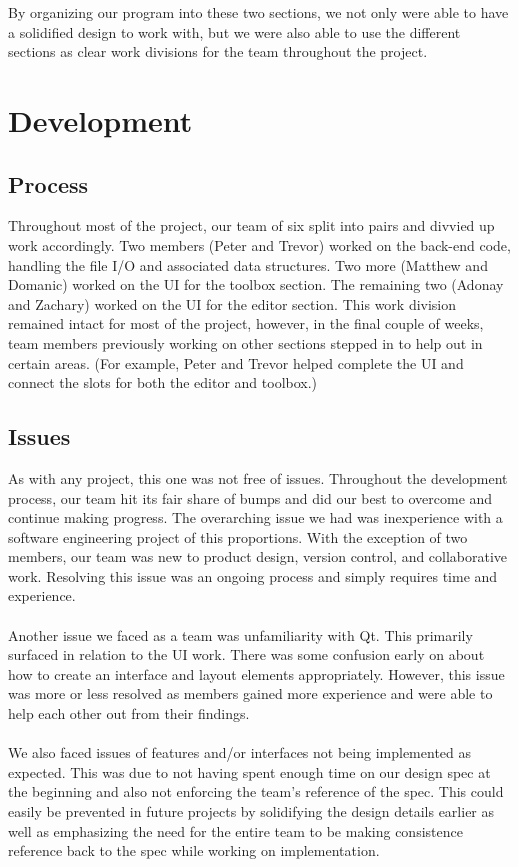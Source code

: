 \documentclass[12pt]{article}
\begin{document}
	By organizing our program into these two sections, we not only were able to have a solidified design to work with, but we were also able to use the different sections as clear work divisions for the team throughout the project. 
	
	\clearpage
	\section{Development}
	\subsection{Process}
	Throughout most of the project, our team of six split into pairs and divvied up work accordingly. Two members (Peter and Trevor) worked on the back-end code, handling the file I/O and associated data structures. Two more (Matthew and Domanic) worked on the UI for the toolbox section. The remaining two (Adonay and Zachary) worked on the UI for the editor section. This work division remained intact for most of the project, however, in the final couple of weeks, team members previously working on other sections stepped in to help out in certain areas. (For example, Peter and Trevor helped complete the UI and connect the slots for both the editor and toolbox.) 
	\subsection{Issues}
	As with any project, this one was not free of issues. Throughout the development process, our team hit its fair share of bumps and did our best to overcome and continue making progress. The overarching issue we had was inexperience with a software engineering project of this proportions. With the exception of two members, our team was new to product design, version control, and collaborative work. Resolving this issue was an ongoing process and simply requires time and experience.\\
	\\
	Another issue we faced as a team was unfamiliarity with Qt. This primarily surfaced in relation to the UI work. There was some confusion early on about how to create an interface and layout elements appropriately. However, this issue was more or less resolved as members gained more experience and were able to help each other out from their findings.\\
	\\
	We also faced issues of features and/or interfaces not being implemented as expected. This was due to not having spent enough time on our design spec at the beginning and also not enforcing the team's reference of the spec. This could easily be prevented in future projects by solidifying the design details earlier as well as emphasizing the need for the entire team to be making consistence reference back to the spec while working on implementation.
	
\end{document}

